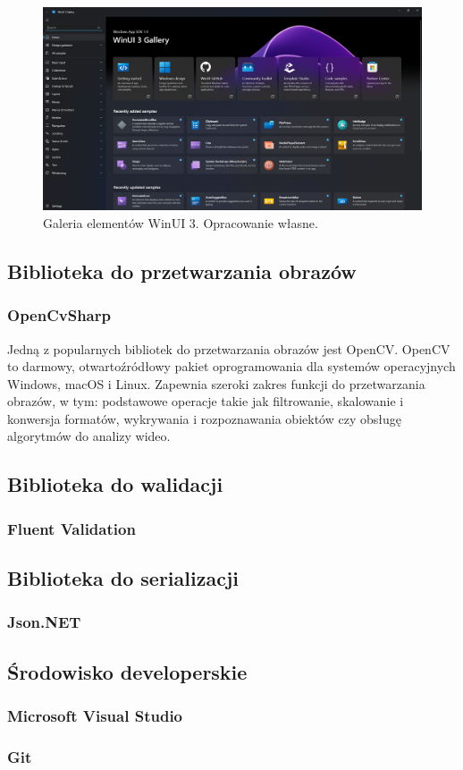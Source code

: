 \begin{figure}[H]
    \centering
    \includegraphics[width=0.8\linewidth]{./images/Picture9.png}
    \caption{Galeria elementów WinUI 3. Opracowanie własne.}
    \label{fig:winui3}
\end{figure}

\subsection{Biblioteka do przetwarzania obrazów}
\subsubsection{OpenCvSharp}
Jedną z popularnych bibliotek do przetwarzania obrazów jest OpenCV.
OpenCV to darmowy, otwartoźródłowy pakiet oprogramowania dla systemów operacyjnych Windows, macOS i Linux.
Zapewnia szeroki zakres funkcji do przetwarzania obrazów, w tym: podstawowe operacje takie jak filtrowanie, skalowanie i konwersja formatów, wykrywania i rozpoznawania obiektów czy obsługę algorytmów do analizy wideo.
\subsection{Biblioteka do walidacji}
\subsubsection{Fluent Validation}
\subsection{Biblioteka do serializacji}
\subsubsection{Json.NET}
\subsection{Środowisko developerskie}
\subsubsection{Microsoft Visual Studio}
\subsubsection{Git}